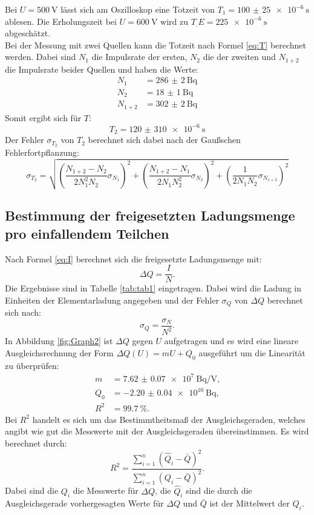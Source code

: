 Bei $U=\SI{500}{\volt}$ lässt sich am Oszilloskop eine Totzeit von $T_1=\SI{100(25)e-6}{\second}$ ablesen. Die Erholungszeit bei $U=\SI{600}{\volt}$ wird zu $T_.E=\SI{225e-6}{\second}$ abgeschätzt.\\
Bei der Messung mit zwei Quellen kann die Totzeit nach Formel \eqref{eq:T} berechnet werden. Dabei sind $N_1$ die Impulsrate der ersten, $N_2$ die der zweiten und $N_{1+2}$ die Impulsrate beider Quellen und haben die Werte:
\begin{align*}
N_1 	&= \SI{286(2)}{\becquerel}\\
N_2 	&= \SI{18(1)}{\becquerel}\\
N_{1+2}	&= \SI{302(2)}{\becquerel}
\end{align*} 
Somit ergibt sich für $T$:
\begin{equation*}
T_2 = \SI{120(310)e-6}{\second}
\end{equation*}
Der Fehler $\sigma_{T_2}$ von $T_2$ berechnet sich dabei nach der Gaußschen Fehlerfortpflanzung:
\begin{equation}
\sigma_{T_2} = \sqrt{\left(\frac{N_{1+2}-N_2}{2N_1^2N_2}\sigma_{N_1}\right)^2+\left(\frac{N_{1+2}-N_1}{2N_1N_2^2}\sigma_{N_2}\right)^2+\left(\frac{1}{2N_1N_2}\sigma_{N_{1+2}}\right)^2}
\end{equation}



\subsection{Bestimmung der freigesetzten Ladungsmenge pro einfallendem Teilchen}

Nach Formel \eqref{eq:I} berechnet sich die freigesetzte Ladungsmenge mit:
\begin{equation*}
\Delta Q = \frac{I}{N} \text{.}
\end{equation*}
Die Ergebnisse sind in Tabelle \ref{tab:tab1} eingetragen. Dabei wird die Ladung in Einheiten der Elementarladung angegeben und der Fehler $\sigma_Q$ von $\Delta Q$ berechnet sich nach:
\begin{equation*}
\sigma_Q = \frac{\sigma_N}{N^2} \text{.}
\end{equation*}
In Abbildung \ref{fig:Graph2} ist $\Delta Q$ gegen $U$ aufgetragen und es wird eine lineare Ausgleichsrechnung der Form $\Delta Q(U) = mU+Q_0$ ausgeführt um die Linearität zu überprüfen:
\begin{align*}
m 	&= \SI{7.62(7)e7}{\becquerel\per\volt} \text{,}\\
Q_0	&= \SI{-2.20(4)e10}{\becquerel}\text{,}\\
R^2 &= \SI{99.7}{\%}\text{.}
\end{align*}   
Bei $R^2$ handelt es sich um das Bestimmtheitsmaß der Ausgleichsgeraden, welches angibt wie gut die Messwerte mit der Ausgleichsgeraden übereinstimmen. Es wird berechnet durch:
\begin{equation*}
R^2 = \frac{\sum_{i=1}^n\left(\hat{Q}_i-\bar{Q}\right)^2}{\sum_{i=1}^n\left(Q_i-\bar{Q}\right)^2} \text{.}
\end{equation*}
Dabei sind die $Q_i$ die Messwerte für $\Delta Q$, die $\hat{Q}_i$ sind die durch die Ausgleichsgerade vorhergesagten Werte für $\Delta Q$ und $\bar{Q}$ ist der Mittelwert der $Q_i$.  

